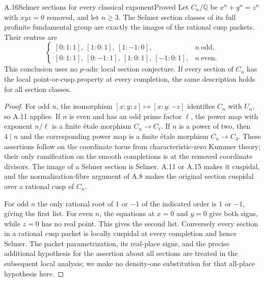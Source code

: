 \begin{statement}{A.16}{Selmer sections for every classical exponent}{Proved}
Let $C_n/\mathbb Q$ be $x^n+y^n=z^n$ with $xyz=0$ removed, and let
$n\geq3$. The Selmer section classes of its full profinite fundamental
group are exactly the images of the rational cusp packets. Their
centres are
\[
 \begin{cases}
 [0:1:1],\ [1:0:1],\ [1:-1:0],&n\ \text{odd},\\
 [0:1:1],\ [0:-1:1],\ [1:0:1],\ [-1:0:1],&n\ \text{even}.
 \end{cases}
\]
This conclusion uses no $p$-adic local section conjecture. If every
section of $C_n$ has the local point-or-cusp property at every
completion, the same description holds for all section classes.
\end{statement}
\begin{proof}
For odd $n$, the isomorphism $[x:y:z]\mapsto[x:y:-z]$ identifies
$C_n$ with $U_n$, so A.11 applies. If $n$ is even and has an odd
prime factor $\ell$, the power map with exponent $n/\ell$ is a
finite \'etale morphism $C_n\to C_\ell$. If $n$ is a power of two,
then $4\mid n$ and the corresponding power map is a finite \'etale
morphism $C_n\to C_4$. These assertions follow on the coordinate
torus from characteristic-zero Kummer theory; their only ramification
on the smooth completions is at the removed coordinate divisors.
The image of a Selmer section is Selmer. A.11 or A.15 makes it
cuspidal, and the normalization-fibre argument of A.8 makes the
original section cuspidal over a rational cusp of $C_n$.

For odd $n$ the only rational root of $1$ or $-1$ of the indicated
order is $1$ or $-1$, giving the first list. For even $n$, the equations
at $x=0$ and $y=0$ give both signs, while $z=0$ has no real point.
This gives the second list. Conversely every section in a rational
cusp packet is locally cuspidal at every completion and hence Selmer.
The packet parametrization, its real-place signs, and the precise
additional hypothesis for the assertion about all sections are treated
in the subsequent local analysis; we make no density-one substitution
for that all-place hypothesis here.
\end{proof}
